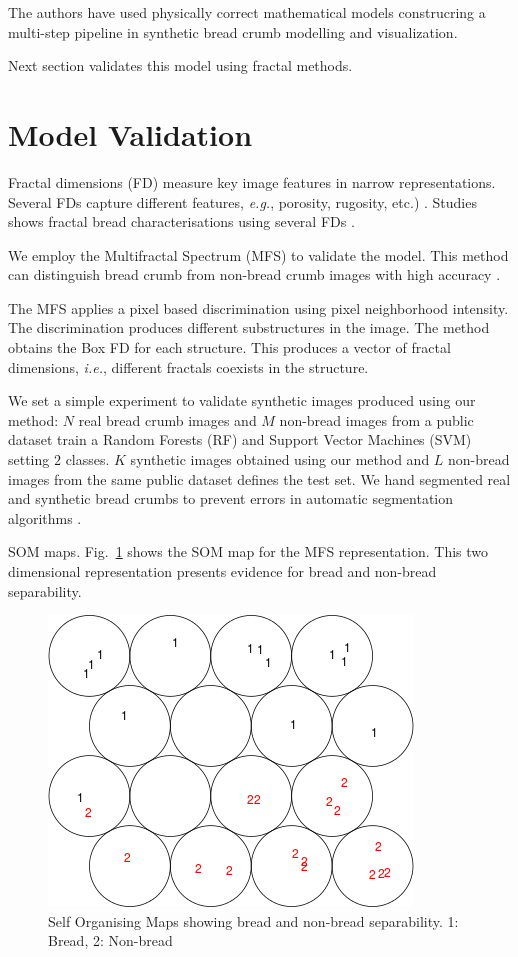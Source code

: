 \documentclass[final,5p,times]{elsarticle}
\begin{document}
The authors have used physically correct mathematical models construcring a multi-step pipeline in synthetic bread crumb modelling and visualization. 

Next section validates this model using fractal methods.



\section{Model Validation}

Fractal dimensions (FD) measure key image features in narrow representations. Several FDs capture different features, {\em e.g.}, porosity, rugosity, etc.) . Studies shows fractal bread characterisations using several FDs \cite{Gonzales2008,Baravalle2012}. 

We employ the Multifractal Spectrum (MFS) \cite{Xu2009} to validate the model. This method can distinguish bread crumb from non-bread crumb images with high accuracy  \cite{Baravalle2012}.

The MFS applies a pixel based discrimination using pixel neighborhood intensity. The discrimination produces different substructures in the image. The method obtains the Box FD \cite{Peitgen2004} for each structure. This produces a vector of fractal dimensions, {\em i.e.}, different fractals coexists in the structure.

We set a simple experiment to validate synthetic images produced using our method: $N$ real bread crumb images  and $M$ non-bread images from a public dataset \cite{FeiFei2004} train a Random Forests (RF) \cite{Breiman2001} and Support Vector Machines (SVM) \cite{Vapnik1995} setting $2$ classes. $K$ synthetic images obtained using our method and $L$ non-bread images from the same public dataset defines the test set. We hand segmented real and synthetic bread crumbs to prevent errors in automatic segmentation algorithms \cite{Bosch2011}.

SOM maps. 
Fig.~\ref{Fig5} shows the SOM map for the MFS representation. This two dimensional representation presents evidence for bread and non-bread separability.

\begin{figure}[h!]
\includegraphics[scale=0.65]{som.png}
\caption{Self Organising Maps showing bread and non-bread separability. 1: Bread, 2: Non-bread }
\label{Fig5}
\end{figure}
\end{document}
